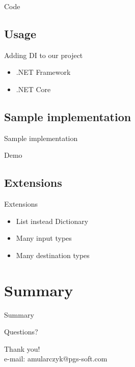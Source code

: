 \documentclass{beamer}
\begin{document}
\begin{frame}{}
\begin{center}
\Huge{Code}
\end{center}
\end{frame}

\subsection*{Usage}
\begin{frame}{Adding DI to our project}
\begin{center}
\Large{\begin{itemize}
	\item .NET Framework
	\item .NET Core
\end{itemize}}
\end{center}
\end{frame}

\subsection*{Sample implementation}
\begin{frame}{Sample implementation}
\begin{center}
\Huge{Demo}
\end{center}
\end{frame}

\subsection*{Extensions}
\begin{frame}{Extensions}
\begin{center}
\Large{\begin{itemize}
	\item List instead Dictionary
	\item Many input types
	\item Many destination types
\end{itemize}}
\end{center}
\end{frame}	


\section{Summary}

\begin{frame}{}
\begin{center}
\Huge{Summary}
\end{center}
\end{frame}

\begin{frame}{Questions?}
\begin{center}
\Huge{Thank you!}\\
\Large{e-mail: amularczyk@pgs-soft.com}
\end{center}
\end{frame}
\end{document}
